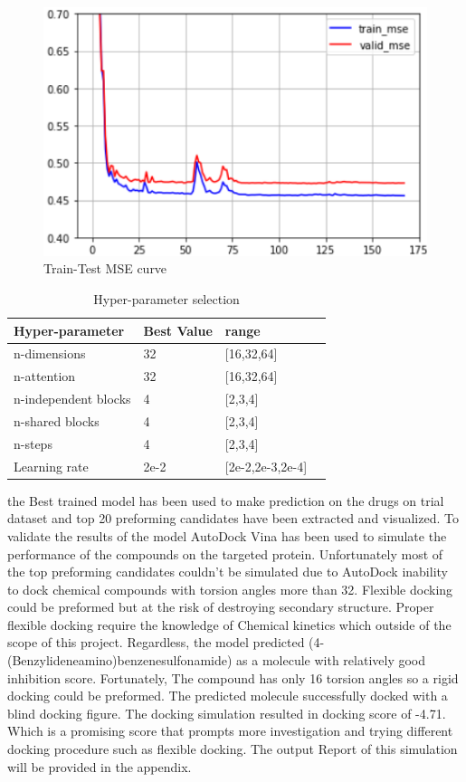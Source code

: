 \documentclass[10pt,twocolumn,letterpaper]{article}
\begin{document}
\begin{figure}[h!]
  \includegraphics[width=\linewidth]{results.png}
  \caption{Train-Test MSE curve}
  \label{fig:graph}
\end{figure}


\begin{table}[htb]
\centering
\begin{tabular}{|l|l|l|l|} 
\hline
Hyper-parameter     & Best Value & range  \\ 
\hline
n-dimensions   & 32 & [16,32,64]    \\ 
\hline
n-attention   & 32 &  [16,32,64]   \\ 
\hline
n-independent blocks  & 4   & [2,3,4]  \\
\hline
n-shared blocks    & 4  & [2,3,4]  \\
\hline
n-steps     & 4  &   [2,3,4] \\
\hline
Learning rate     & 2e-2  &  [2e-2,2e-3,2e-4]  \\
\hline
\end{tabular}
\caption{Hyper-parameter selection}
\label{tab:class_per}
\end{table}

the Best trained model has been used to make prediction on the drugs on trial dataset and top 20 preforming candidates have been extracted and visualized. To validate the results of the model AutoDock Vina has been used to simulate the performance of the compounds on the targeted protein. Unfortunately most of the top preforming candidates couldn't be simulated due to AutoDock inability to dock chemical compounds with torsion angles more than 32. Flexible docking could be preformed but at the risk of destroying secondary structure. Proper flexible docking require the knowledge of Chemical kinetics which outside of the scope of this project. Regardless, the model predicted (4-(Benzylideneamino)benzenesulfonamide) as a molecule with relatively good inhibition score. Fortunately, The compound has only 16 torsion angles so a rigid docking could be preformed. The predicted molecule successfully docked with a blind docking figure. The docking simulation resulted in docking score of -4.71. Which is a promising score that prompts more investigation and trying different docking procedure such as flexible docking. The output Report of this simulation will be provided in the appendix. 
\end{document}
